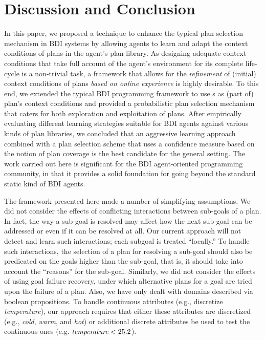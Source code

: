 \section{Discussion and Conclusion}\label{sec:discussion}

In this paper, we proposed a technique to enhance the typical plan selection
mechanism in BDI systems by allowing agents to learn and adapt the context
conditions of plans in the agent's plan library.
As designing adequate context conditions that take full account of the agent's
environment for its complete life-cycle is a non-trivial task, a framework that
allows for the \emph{refinement} of (initial) context conditions of plans
\textit{based on online experience} is highly desirable.
To this end, we extended the typical BDI programming framework to use \dt{}s as
(part of) plan's context conditions and provided a probabilistic plan selection
mechanism that caters for both exploration and exploitation of plans.
After empirically evaluating different learning strategies suitable for BDI
agents against various kinds of plan libraries, we concluded that an aggressive
learning approach combined with a plan selection scheme that uses a confidence
measure based on the notion of plan coverage is the best candidate for the
general setting.
The work carried out here is significant for the BDI agent-oriented programming
community, in that it provides a solid foundation for going beyond the standard
static kind of BDI agents.

The framework presented here made a number of simplifying assumptions.
We did not consider the effects of conflicting interactions between sub-goals of
a plan. In fact, the way a sub-goal is resolved may affect how the next sub-goal
can be addressed or even if it can be resolved at all.
Our current approach will not detect and learn such interactions; each subgoal
is treated ``locally.'' To handle such interactions, the selection of a plan for 
resolving a sub-goal should also be predicated on the goals higher than the
sub-goal, that is, it should take into account the ``reasons'' for the sub-goal.
Similarly, we did not consider the effects of using goal failure recovery, under
which alternative plans for a goal are tried upon the failure of a plan.
Also, we have only dealt with domains described via boolean propositions. To
handle continuous attributes (e.g., discretize \emph{temperature}), our approach
requires that either these attributes are discretized (e.g., \emph{cold}, \emph{warm},
and \emph{hot}) or additional discrete
attributes be used to test the continuous ones (e.g. $\emph{temperature} < 25.2$).


